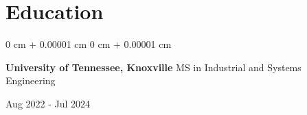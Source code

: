 \documentclass[10pt, letterpaper]{article}
\newenvironment{highlights}{
    \begin{itemize}[
        topsep=0.10 cm,
        parsep=0.10 cm,
        partopsep=0pt,
        itemsep=0pt,
        leftmargin=0 cm + 10pt
    ]
}{
    \end{itemize}
} %
\newenvironment{highlightsforbulletentries}{
    \begin{itemize}[
        topsep=0.10 cm,
        parsep=0.10 cm,
        partopsep=0pt,
        itemsep=0pt,
        leftmargin=10pt
    ]
}{
    \end{itemize}
} %
\newenvironment{onecolentry}{
    \begin{adjustwidth}{
        0 cm + 0.00001 cm
    }{
        0 cm + 0.00001 cm
    }
}{
    \end{adjustwidth}
} %
\newenvironment{twocolentry}[2][]{
    \onecolentry
    \def\secondColumn{#2}
    \setcolumnwidth{\fill, 4.5 cm}
    \begin{paracol}{2}
}{
    \switchcolumn \raggedleft \secondColumn
    \end{paracol}
    \endonecolentry
} %
\begin{document}



    










\section*{Education}
\begin{twocolentry}{Aug 2022 - Jul 2024}
    \textbf{University of Tennessee, Knoxville} \textbar MS in Industrial and Systems Engineering
\end{twocolentry}
\end{document}
